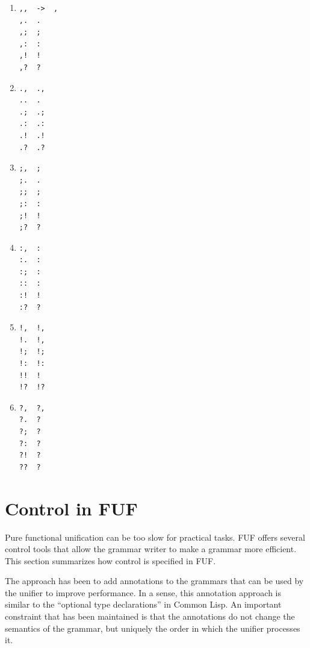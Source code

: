\documentclass[10pt,a4paper]{report}
\begin{document}
\begin{enumerate}
\begin{multicols}{2}
\begin{enumerate}
\item \begin{lstlisting}
,,  ->  ,
,.	.
,;	;
,:	:
,!	!
,?	?
\end{lstlisting}

\item \begin{lstlisting}
.,	.,
..	.
.;	.;
.:	.:
.!	.!
.?	.?
\end{lstlisting}

\item \begin{lstlisting}
;,	;
;.	.
;;	;
;:	:
;!	!
;?	?
\end{lstlisting}

\item \begin{lstlisting}
:,	:
:.	:
:;	:
::	:
:!	!
:?	?
\end{lstlisting}

\item \begin{lstlisting}
!,	!,
!.	!,
!;	!;
!:	!:
!!	!
!?	!?
\end{lstlisting}

\item \begin{lstlisting}
?,	?,
?.	?
?;	?
?:	?
?!	?
??	?
\end{lstlisting}
\end{enumerate}
\end{multicols}
\end{enumerate}



\chapter{Control in FUF}
\label{control}

Pure functional unification can be too slow for practical tasks.  FUF
offers several control tools that allow the grammar writer to make a
grammar more efficient.  This section summarizes how control is specified
in FUF.

The approach has been to add annotations to the grammars that can be used
by the unifier to improve performance.  In a sense, this annotation
approach is similar to the ``optional type declarations'' in Common Lisp.  An
important constraint that has been maintained is that the annotations
do not change the semantics of the grammar, but uniquely the order in
which the unifier processes it.
\end{document}
